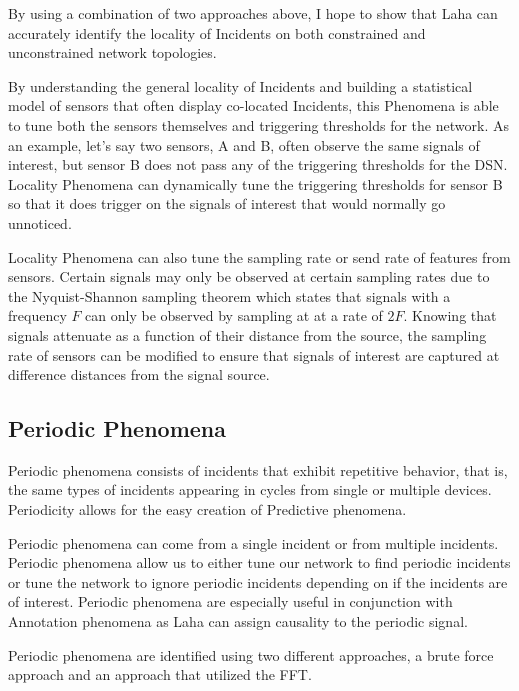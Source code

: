 By using a combination of two approaches above, I hope to show that Laha can accurately identify the locality of Incidents on both constrained and unconstrained network topologies.

By understanding the general locality of Incidents and building a statistical model of sensors that often display co-located Incidents, this Phenomena is able to tune both the sensors themselves and triggering thresholds for the network. As an example, let's say two sensors, A and B, often observe the same signals of interest, but sensor B does not pass any of the triggering thresholds for the DSN. Locality Phenomena can dynamically tune the triggering thresholds for sensor B so that it does trigger on the signals of interest that would normally go unnoticed.

Locality Phenomena can also tune the sampling rate or send rate of features from sensors. Certain signals may only be observed at certain sampling rates due to the Nyquist-Shannon sampling theorem\cite{landau1967sampling} which states that signals with a frequency $F$ can only be observed by sampling at at a rate of $2F$. Knowing that signals attenuate as a function of their distance from the source, the sampling rate of sensors can be modified to ensure that signals of interest are captured at difference distances from the signal source.

\subsection{Periodic Phenomena} \label{subsec:periodicity-phenomena}
Periodic phenomena consists of incidents that exhibit repetitive behavior, that is, the same types of incidents appearing in cycles from single or multiple devices. Periodicity allows for the easy creation of Predictive phenomena.

Periodic phenomena can come from a single incident or from multiple incidents. Periodic phenomena allow us to either tune our network to find periodic incidents or tune the  network to ignore periodic incidents depending on if the incidents are of interest. Periodic phenomena are especially useful in conjunction with Annotation phenomena as Laha can assign causality to the periodic signal.

Periodic phenomena are identified using two different approaches, a brute force approach and an approach that utilized the FFT.

